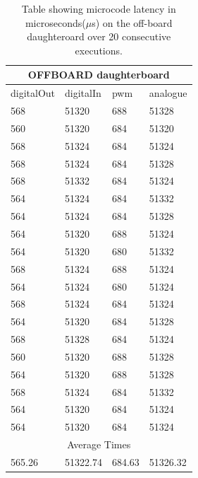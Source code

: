 \begin{table}
	\centering
	\caption{Table showing microcode latency in microseconds($\mu$s) on the off-board daughteroard over 20 consecutive executions.}
	
	\begin{tabular}{|l|l|l|l|}
	\toprule
 \multicolumn{4}{c}{\textbf{OFFBOARD daughterboard}} \\\hline
digitalOut & digitalIn & pwm & analogue\\\hline
568 & 51320 & 688 & 51328\\\hline
560 & 51320 & 684 & 51320\\\hline
568 & 51324 & 684 & 51324\\\hline
568 & 51324 & 684 & 51328\\\hline
568 & 51332 & 684 & 51324\\\hline
564 & 51324 & 684 & 51332\\\hline
564 & 51324 & 684 & 51328\\\hline
564 & 51320 & 688 & 51324\\\hline
564 & 51320 & 680 & 51332\\\hline
568 & 51324 & 688 & 51324\\\hline
564 & 51324 & 680 & 51324\\\hline
568 & 51324 & 684 & 51324\\\hline
564 & 51320 & 684 & 51328\\\hline
568 & 51328 & 684 & 51324\\\hline
560 & 51320 & 688 & 51328\\\hline
564 & 51320 & 688 & 51328\\\hline
568 & 51324 & 684 & 51332\\\hline
564 & 51320 & 684 & 51324\\\hline
564 & 51320 & 684 & 51324\\\hline
\multicolumn{4}{c}{Average Times} \\\hline
565.26 & 51322.74 & 684.63 & 51326.32

\end{tabular}
\end{table}

